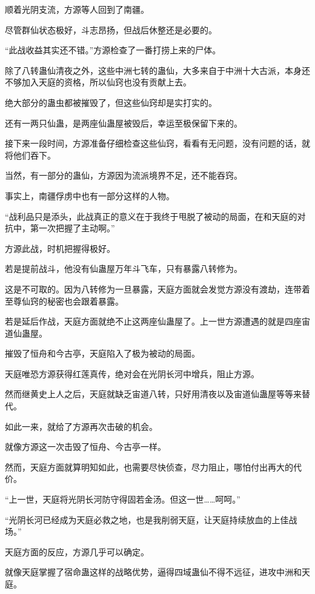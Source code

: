 
\begin{this_body}

顺着光阴支流，方源等人回到了南疆。

尽管群仙状态极好，斗志昂扬，但战后休整还是必要的。

“此战收益其实还不错。”方源检查了一番打捞上来的尸体。

除了八转蛊仙清夜之外，这些中洲七转的蛊仙，大多来自于中洲十大古派，本身还不够加入天庭的资格，所以仙窍也没有贡献上去。

绝大部分的蛊虫都被摧毁了，但这些仙窍却是实打实的。

还有一两只仙蛊，是两座仙蛊屋被毁后，幸运至极保留下来的。

接下来一段时间，方源准备仔细检查这些仙窍，看看有无问题，没有问题的话，就将他们吞下。

当然，有一部分的蛊仙，方源因为流派境界不足，还不能吞窍。

事实上，南疆俘虏中也有一部分这样的人物。

“战利品只是添头，此战真正的意义在于我终于甩脱了被动的局面，在和天庭的对抗中，第一次把握了主动啊。”

方源此战，时机把握得极好。

若是提前战斗，他没有仙蛊屋万年斗飞车，只有暴露八转修为。

这是不可取的。因为八转修为一旦暴露，天庭方面就会发觉方源没有渡劫，连带着至尊仙窍的秘密也会跟着暴露。

若是延后作战，天庭方面就绝不止这两座仙蛊屋了。上一世方源遭遇的就是四座宙道仙蛊屋。

摧毁了恒舟和今古亭，天庭陷入了极为被动的局面。

天庭唯恐方源获得红莲真传，绝对会在光阴长河中增兵，阻止方源。

然而继黄史上人之后，天庭就缺乏宙道八转，只好用清夜以及宙道仙蛊屋等等来替代。

如此一来，就给了方源再次击破的机会。

就像方源这一次击毁了恒舟、今古亭一样。

然而，天庭方面就算明知如此，也需要尽快侦查，尽力阻止，哪怕付出再大的代价。

“上一世，天庭将光阴长河防守得固若金汤。但这一世……呵呵。”

“光阴长河已经成为天庭必救之地，也是我削弱天庭，让天庭持续放血的上佳战场。”

天庭方面的反应，方源几乎可以确定。

就像天庭掌握了宿命蛊这样的战略优势，逼得四域蛊仙不得不远征，进攻中洲和天庭。


\end{this_body}

